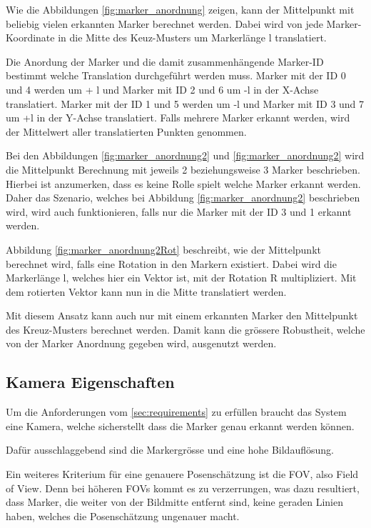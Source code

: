 Wie die Abbildungen \ref{fig:marker_anordnung} zeigen, kann der Mittelpunkt mit beliebig vielen erkannten Marker berechnet werden.
Dabei wird von jede Marker-Koordinate in die Mitte des Keuz-Musters um Markerlänge l translatiert.

Die Anordung der Marker und die damit zusammenhängende Marker-ID bestimmt welche Translation durchgeführt werden muss. 
Marker mit der ID 0 und 4 werden um + l und Marker mit ID 2 und 6 um -l in der X-Achse translatiert. 
Marker mit der ID 1 und 5 werden um -l und Marker mit ID 3 und 7 um +l in der Y-Achse translatiert. 
Falls mehrere Marker erkannt werden, wird der Mittelwert aller translatierten Punkten genommen.

Bei den Abbildungen \ref{fig:marker_anordnung2} und \ref{fig:marker_anordnung2} wird die Mittelpunkt Berechnung mit jeweils 2 beziehungsweise 3 Marker beschrieben.
Hierbei ist anzumerken, dass es keine Rolle spielt welche Marker erkannt werden. 
Daher das Szenario, welches bei Abbildung \ref{fig:marker_anordnung2} beschrieben wird, wird auch funktionieren, falls nur die Marker mit der ID 3 und 1 erkannt werden.

Abbildung \ref{fig:marker_anordnung2Rot} beschreibt, wie der Mittelpunkt berechnet wird, falls eine Rotation in den Markern existiert.
Dabei wird die Markerlänge l, welches hier ein Vektor ist, mit der Rotation R multipliziert. 
Mit dem rotierten Vektor kann nun in die Mitte translatiert werden.  

Mit diesem Ansatz kann auch nur mit einem erkannten Marker den Mittelpunkt des Kreuz-Musters berechnet werden. 
Damit kann die grössere Robustheit, welche von der Marker Anordnung gegeben wird, ausgenutzt werden.


\subsection{Kamera Eigenschaften}

Um die Anforderungen vom \ref{sec:requirements} zu erfüllen braucht das System eine Kamera, welche sicherstellt dass die Marker genau erkannt werden können.

Dafür ausschlaggebend sind die Markergrösse und eine hohe Bildauflösung\cite{noauthor_designing_2020}. 

Ein weiteres Kriterium für eine genauere Posenschätzung ist die FOV, also Field of View. 
Denn bei höheren FOVs kommt es zu verzerrungen, was dazu resultiert, dass Marker, die weiter von der Bildmitte entfernt sind, keine geraden Linien haben, welches die Posenschätzung ungenauer macht.


